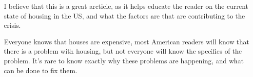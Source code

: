 \documentclass{article}
\begin{document}
I believe that this is a great arcticle, as it helps educate
the reader on the current state of housing in the US, and what
the factors are that are contributing to the crisis.

Everyone knows that houses are expensive, most American readers
will know that there is a problem with housing, but not everyone
will know the specifics of the problem. It's rare to know exactly why 
these problems are happening, and what can be done to fix them.



\begin{refcontext}[sorting=nyt]
\printbibliography
\end{refcontext}
\end{document}
